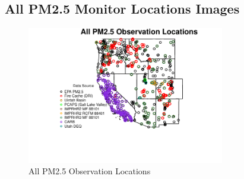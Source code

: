 
\subsection{All PM2.5 Monitor Locations Images} 
 

\begin{figure} 
\centering  
\includegraphics[width=0.77\textwidth]{Code_Outputs/MapPM25_All_SitesY0_ObsMapY0.pdf} 
\caption{\label{fig:MapPM25_All_SitesY0ObsMapY0}All PM2.5 Observation Locations} 
\end{figure} 
 
